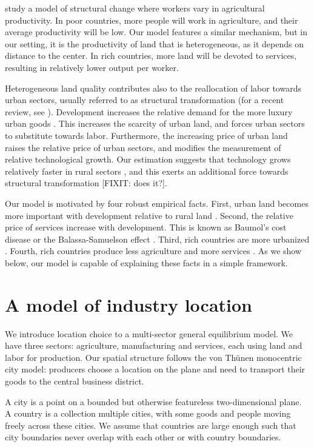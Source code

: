 \documentclass[12pt]{article}
\begin{document}
 study a model of structural change where workers vary in agricultural productivity. In poor countries, more people will work in agriculture, and their average productivity will be low. Our model features a similar mechanism, but in our setting, it is the productivity of land that is heterogeneous, as it depends on distance to the center. In rich countries, more land will be devoted to services, resulting in relatively lower output per worker.

Heterogeneous land quality contributes also to the reallocation of labor towards urban sectors, usually referred to as structural transformation (for a recent review, see ). Development increases the relative demand for the more luxury urban goods \cite{Echevarria97,Kongsamut01,Gollin02}. This increases the scarcity of urban land, and forces urban sectors to substitute towards labor. Furthermore, the increasing price of urban land raises the relative price of urban sectors, and modifies the measurement of relative technological growth. Our estimation suggests that technology grows relatively faster in rural sectors \cite{Ngai07,Restuccia08}, and this exerts an additional force towards structural transformation [FIXIT: does it?].

Our model is motivated by four robust empirical facts. First, urban land becomes more important with development relative to rural land \cite[Figure 10.3]{Clark}. Second, the relative price of services increase with development. This is known as Baumol's cost disease \cite{Baumol65} or the Balassa-Samuelson effect \cite{Balassa64,Samuelson64}. Third, rich countries are more urbanized \cite{United_Nations2014-zm}. Fourth, rich countries produce less agriculture and more services \cite{Kuznets1973,Ngai2007,Kongsamut01}. As we show below, our model is capable of explaining these facts in a simple framework.


\section{A model of industry location}
We introduce location choice to a multi-sector general equilibrium model. We have three sectors: agriculture, manufacturing and services, each using land and labor for production. Our spatial structure follows the von Thünen monocentric city model: producers choose a location on the plane and need to transport their goods to the central business district.

A city is a point on a bounded but otherwise featureless two-dimensional plane. A country is a collection multiple cities, with some goods and people moving freely across these cities. We assume that countries are large enough such that city boundaries never overlap with each other or with country boundaries.
\end{document}
